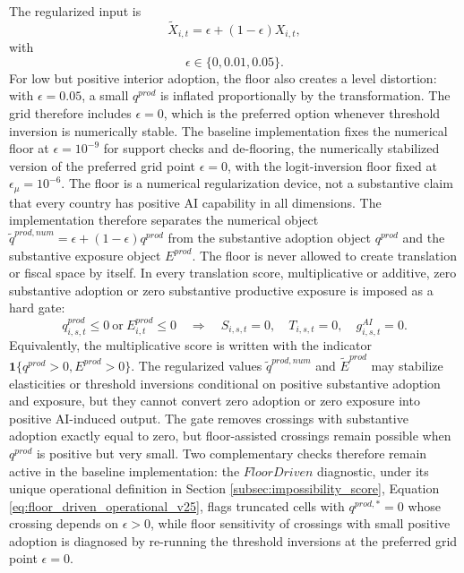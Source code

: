 \documentclass[11pt,a4paper]{article}
\begin{document}
The regularized input is
\begin{equation}
    \tilde X_{i,t}=\epsilon+(1-\epsilon)X_{i,t},
\end{equation}
with
\begin{equation}
    \epsilon\in\{0,0.01,0.05\}.
\end{equation}
For low but positive interior adoption, the floor also creates a level distortion: with $\epsilon=0.05$, a small $q^{prod}$ is inflated proportionally by the transformation. The grid therefore includes $\epsilon=0$, which is the preferred option whenever threshold inversion is numerically stable. The baseline implementation fixes the numerical floor at $\epsilon=10^{-9}$ for support checks and de-flooring, the numerically stabilized version of the preferred grid point $\epsilon=0$, with the logit-inversion floor fixed at $\epsilon_\mu=10^{-6}$.
The floor is a numerical regularization device, not a substantive claim that every country has positive AI capability in all dimensions. The implementation therefore separates the numerical object $\tilde q^{prod,num}=\epsilon+(1-\epsilon)q^{prod}$ from the substantive adoption object $q^{prod}$ and the substantive exposure object $E^{prod}$. The floor is never allowed to create translation or fiscal space by itself. In every translation score, multiplicative or additive, zero substantive adoption or zero substantive productive exposure is imposed as a hard gate:
\begin{equation}\label{eq:q_zero_gate_v21}
    q^{prod}_{i,s,t}\leq0\ \text{or}\ E^{prod}_{i,t}\leq0\quad\Longrightarrow\quad
    S_{i,s,t}=0,\quad T_{i,s,t}=0,\quad g^{AI}_{i,s,t}=0.
\end{equation}
Equivalently, the multiplicative score is written with the indicator $\mathbf{1}\{q^{prod}>0,E^{prod}>0\}$. The regularized values $\tilde q^{prod,num}$ and $\tilde E^{prod}$ may stabilize elasticities or threshold inversions conditional on positive substantive adoption and exposure, but they cannot convert zero adoption or zero exposure into positive AI-induced output. The gate removes crossings with substantive adoption exactly equal to zero, but floor-assisted crossings remain possible when $q^{prod}$ is positive but very small. Two complementary checks therefore remain active in the baseline implementation: the $FloorDriven$ diagnostic, under its unique operational definition in Section \ref{subsec:impossibility_score}, Equation \eqref{eq:floor_driven_operational_v25}, flags truncated cells with $q^{prod,*}=0$ whose crossing depends on $\epsilon>0$, while floor sensitivity of crossings with small positive adoption is diagnosed by re-running the threshold inversions at the preferred grid point $\epsilon=0$.
\end{document}
